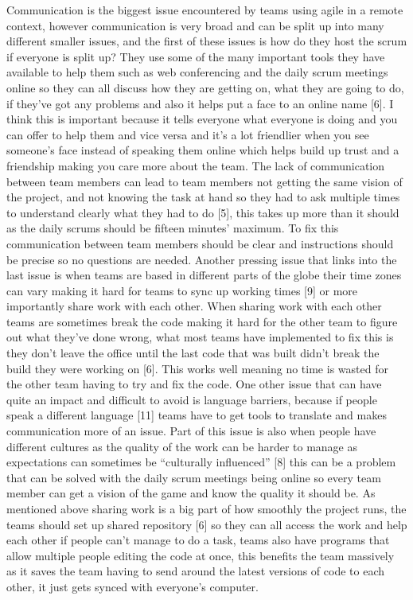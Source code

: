 \documentclass{scrartcl}
\begin{document}
Communication is the biggest issue encountered by teams using agile in a remote context, however communication is very broad and can be split up into many different smaller issues, and the first of these issues is how do they host the scrum if everyone is split up? They use some of the many important tools they have available to help them such as web conferencing and the daily scrum meetings online so they can all discuss how they are getting on, what they are going to do, if they’ve got any problems and also it helps put a face to an online name [6]. I think this is important because it tells everyone what everyone is doing and you can offer to help them and vice versa and it’s a lot friendlier when you see someone’s face instead of speaking them online which helps build up trust and a friendship making you care more about the team. The lack of communication between team members can lead to team members not getting the same vision of the project, and not knowing the task at hand so they had to ask multiple times to understand clearly what they had to do [5], this takes up more than it should as the daily scrums should be fifteen minutes’ maximum. To fix this communication between team members should be clear and instructions should be precise so no questions are needed.
Another pressing issue that links into the last issue is when teams are based in different parts of the globe their time zones can vary making it hard for teams to sync up working times [9] or more importantly share work with each other. When sharing work with each other teams are sometimes break the code making it hard for the other team to figure out what they’ve done wrong, what most teams have implemented to fix this is they don’t leave the office until the last code that was built didn’t break the build they were working on [6]. This works well meaning no time is wasted for the other team having to try and fix the code.
One other issue that can have quite an impact and difficult to avoid is language barriers, because if people speak a different language [11] teams have to get tools to translate and makes communication more of an issue. Part of this issue is also when people have different cultures as the quality of the work can be harder to manage as expectations can sometimes be “culturally influenced” [8] this can be a problem that can be solved with the daily scrum meetings being online so every team member can get a vision of the game and know the quality it should be.
As mentioned above sharing work is a big part of how smoothly the project runs, the teams should set up shared repository [6] so they can all access the work and help each other if people can’t manage to do a task, teams also have programs that allow multiple people editing the code at once, this benefits the team massively as it saves the team having to send around the latest versions of code to each other, it just gets synced with everyone’s computer. 
\end{document}
